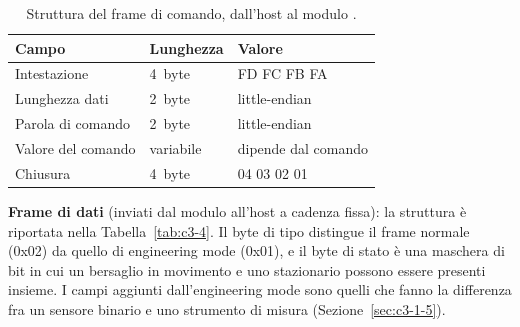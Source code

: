 \begin{table}[!htb]
\centering
\caption{Struttura del frame di comando, dall'host al modulo \cite{hilinkProtoV107}.}
\label{tab:c3-3}
\small
\begin{tabularx}{\linewidth}{@{}llX@{}}
\toprule
\textbf{Campo} & \textbf{Lunghezza} & \textbf{Valore} \\
\midrule
Intestazione & 4~byte & FD FC FB FA \\
Lunghezza dati & 2~byte & little-endian \\
Parola di comando & 2~byte & little-endian \\
Valore del comando & variabile & dipende dal comando \\
Chiusura & 4~byte & 04 03 02 01 \\
\bottomrule
\end{tabularx}
\end{table}

\textbf{Frame di dati} (inviati dal modulo all'host a cadenza fissa): la struttura è riportata nella Tabella~\ref{tab:c3-4}. Il byte di tipo distingue il frame normale (0x02) da quello di engineering mode (0x01), e il byte di stato è una maschera di bit in cui un bersaglio in movimento e uno stazionario possono essere presenti insieme. I campi aggiunti dall'engineering mode sono quelli che fanno la differenza fra un sensore binario e uno strumento di misura (Sezione~\ref{sec:c3-1-5}).

